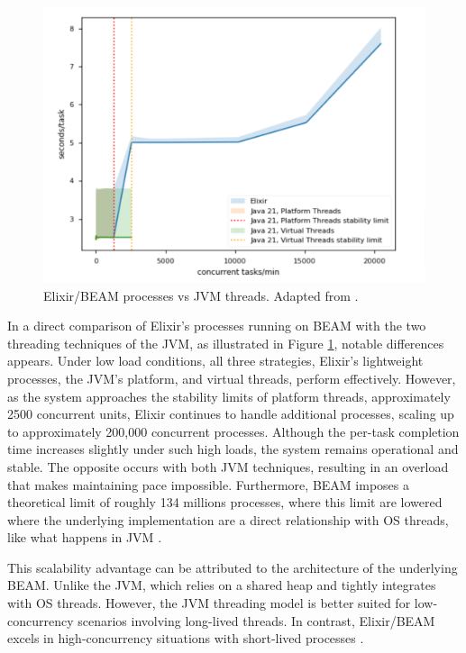 \begin{figure}
    \centering
    \includegraphics[width=120mm]{ch-state/assets/elixir-vs-jvm-threads}
    \caption[Elixir/BEAM processes vs JVM threads]{Elixir/BEAM processes vs JVM threads. Adapted from \cite{erlang-concurrency-blog}.}
    \label{fig:beam-vs-jvm}
\end{figure}

In a direct comparison of Elixir’s processes running on \gls{BEAM} with the two threading techniques of the \gls{JVM}, as illustrated in Figure \ref{fig:beam-vs-jvm}, notable differences appears. Under low load conditions, all three strategies, Elixir’s lightweight processes, the \gls{JVM}’s platform, and virtual threads, perform effectively. However, as the system approaches the stability limits of platform threads, approximately 2500 concurrent units, Elixir continues to handle additional processes, scaling up to approximately 200,000 concurrent processes. Although the per-task completion time increases slightly under such high loads, the system remains operational and stable. The opposite occurs with both \gls{JVM} techniques, resulting in an overload that makes maintaining pace impossible. Furthermore, \gls{BEAM} imposes a theoretical limit of roughly 134 millions processes, where this limit are lowered where the underlying implementation are a direct relationship with \gls{OS} threads, like what happens in \gls{JVM} \cite{Juric2024}.

This scalability advantage can be attributed to the architecture of the underlying \gls{BEAM}. Unlike the \gls{JVM}, which relies on a shared heap and tightly integrates with \gls{OS} threads. However, the \gls{JVM} threading model is better suited for low-concurrency scenarios involving long-lived threads. In contrast, Elixir/\gls{BEAM} excels in high-concurrency situations with short-lived processes \cite{erlang-concurrency-blog, Valkov2018}.

